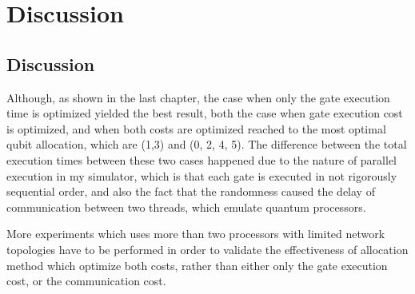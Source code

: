 \chapter{Discussion}
\label{discussion}

\section{Discussion}
Although, as shown in the last chapter, the case when only the gate execution time is optimized yielded the best result, both the case when gate execution cost is optimized,  and when both costs are optimized reached to the most optimal qubit allocation, which are (1,3) and (0, 2, 4, 5).  The difference between the total execution times between these two cases happened due to the nature of parallel execution in my simulator, which is that each gate is executed in not rigorously sequential order, and also the fact that the randomness caused the delay of communication between two threads, which emulate quantum processors.

More experiments which uses more than two processors with limited network topologies have to be performed in order to validate the effectiveness of allocation method which optimize both costs, rather than either only the gate execution cost, or the communication cost.




